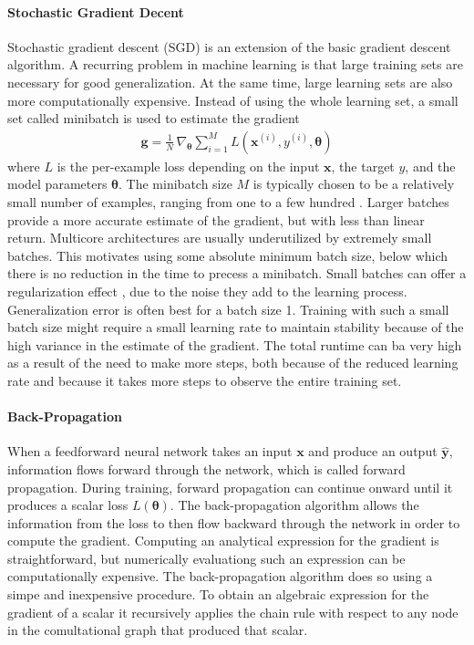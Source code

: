\documentclass{scrartcl}
\begin{document}
\paragraph{Stochastic Gradient Decent}
Stochastic gradient descent (SGD) is an extension of the basic gradient descent algorithm. A recurring problem in machine learning is that large training sets are necessary for good generalization. At the same time, large learning sets are also more computationally expensive. Instead of using the whole learning set, a small set called minibatch is used to estimate the gradient
\begin{align}
\mathbf g = \frac{1}{N} \,\nabla_{\boldsymbol \theta} \sum_{i=1}^M L(\mathbf x^{(i)}, y^{(i)}, \boldsymbol \theta)
\end{align}  
where $L$ is the per-example loss depending on the input $\mathbf x$, the target $y$, and the model parameters $\boldsymbol \theta$. The minibatch size $M$ is typically chosen to be a relatively small number of examples, ranging from one to a few hundred \cite{Goodfellow2016}. Larger batches provide a more accurate estimate of the gradient, but with less than linear return. Multicore architectures are usually underutilized by extremely small batches. This motivates using some absolute minimum batch size, below which there is no reduction in the time to precess a minibatch. Small batches can offer a regularization effect \cite{Wilson2003}, due to the noise they add to the learning process. Generalization error is often best for a batch size 1. Training with such a small batch size might require a small learning rate to maintain stability because of the high variance in the estimate of the gradient. The total runtime can ba very high as a result of the need to make more steps, both because of the reduced learning rate and because it takes more steps to observe the entire training set. 

\paragraph{Back-Propagation}
When a feedforward neural network takes an input $\mathbf x$ and produce an output $\hat{\mathbf y}$, information flows forward through the network, which is called forward propagation. During training, forward propagation can continue onward until it produces a scalar loss $L(\boldsymbol \theta)$. The back-propagation algorithm \cite{Rumelhart1988} allows the information from the loss to then flow backward through the network in order to compute the gradient. Computing an analytical expression for the gradient is straightforward, but numerically evaluationg such an expression can be computationally expensive. The back-propagation algorithm does so using a simpe and inexpensive procedure. To obtain an algebraic expression for the gradient of a scalar it recursively applies the chain rule with respect to any node in the comultational graph that produced that scalar. 
\end{document}
